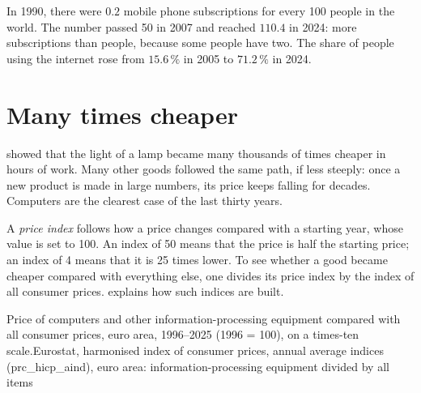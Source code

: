 In 1990, there were $0.2$ mobile phone subscriptions for every 100 people in the
world. The number passed 50 in 2007 and reached $110.4$ in 2024: more subscriptions
than people, because some people have two. The share of people using the internet
rose from $15.6\,\%$ in 2005 to $71.2\,\%$ in 2024.

\section{Many times cheaper}

 showed that the light of a lamp became many
thousands of times cheaper in hours of work. Many other goods followed the same
path, if less steeply: once a new product is made in large numbers, its price
keeps falling for decades. Computers are the clearest case of the last thirty
years.

\begin{measure}
A \emph{price index} follows how a price changes compared with a starting year,
whose value is set to 100. An index of 50 means that the price is half the
starting price; an index of 4 means that it is 25 times lower. To see whether a
good became cheaper compared with everything else, one divides its price index by
the index of all consumer prices. 
explains how such indices are built.
\end{measure}

\begin{omchart}{Price of computers and other information-processing equipment
compared with all consumer prices, euro area, 1996--2025 (1996 = 100), on a
times-ten scale.}{Eurostat, harmonised index of consumer prices, annual average
indices (prc\_hicp\_aind), euro area: information-processing equipment divided by
all items}
\end{omchart}

